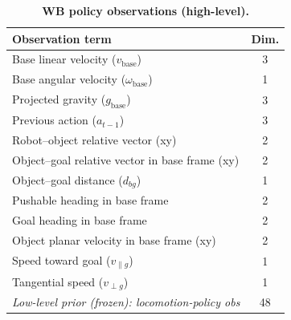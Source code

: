 \begin{table}[h]
\centering
\caption{\textbf{WB policy observations (high-level).}}
\label{tab:obs_wb}
\footnotesize
\setlength{\tabcolsep}{3pt}
\renewcommand{\arraystretch}{1.08}
\begin{tabular}{l c}
\toprule
\textbf{Observation term} & \textbf{Dim.}\\
\midrule
Base linear velocity ($v_{\text{base}}$) & 3\\
Base angular velocity ($\omega_{\text{base}}$) & 1\\
Projected gravity ($g_{\text{base}}$) & 3\\
Previous action ($a_{t-1}$) & 3\\
\addlinespace[0.25em]\hline\addlinespace[0.15em]
Robot--object relative vector (xy) & 2\\
Object--goal relative vector in base frame (xy) & 2\\
Object--goal distance ($d_{bg}$) & 1\\
Pushable heading in base frame & 2\\
Goal heading in base frame & 2\\
\addlinespace[0.25em]\hline\addlinespace[0.15em]
Object planar velocity in base frame (xy) & 2\\
Speed toward goal ($v_{\parallel g}$) & 1\\
Tangential speed ($v_{\perp g}$) & 1\\
\addlinespace[0.25em]\hline\addlinespace[0.15em]
\textit{Low-level prior (frozen): locomotion-policy obs} & 48\\
\bottomrule
\end{tabular}
\end{table}

